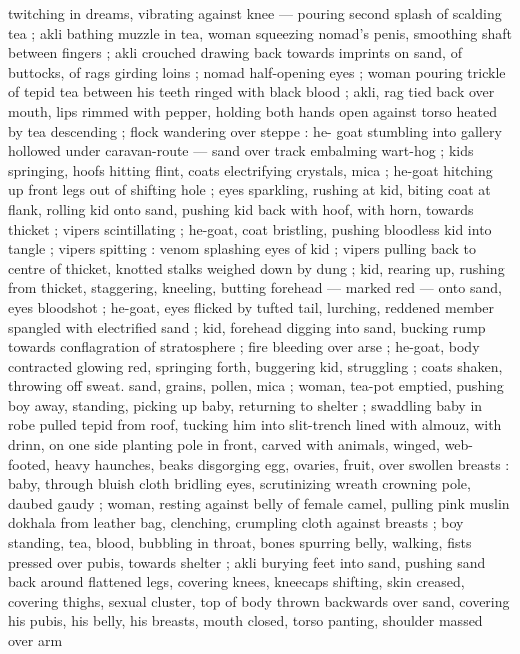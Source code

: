 twitching in dreams, vibrating against knee --- pouring second splash 
of scalding tea ; akli bathing muzzle in tea, woman squeezing 
nomad's penis, smoothing shaft between fingers ; akli crouched 
drawing back towards imprints on sand, of buttocks, of rags girding 
loins ; nomad half-opening eyes ; woman pouring trickle of tepid tea 
between his teeth ringed with black blood ; akli, rag tied back over 
mouth, lips rimmed with pepper, holding both hands open against 
torso heated by tea descending ; flock wandering over steppe : he- 
goat stumbling into gallery hollowed under caravan-route --- sand 
over track embalming wart-hog ; kids springing, hoofs hitting flint, 
coats electrifying crystals, mica ; he-goat hitching up front legs out 
of shifting hole ; eyes sparkling, rushing at kid, biting coat at flank, 
rolling kid onto sand, pushing kid back with hoof, with horn, towards 
thicket ; vipers scintillating ; he-goat, coat bristling, pushing 
bloodless kid into tangle ; vipers spitting : venom splashing eyes of 
kid ; vipers pulling back to centre of thicket, knotted stalks weighed 
down by dung ; kid, rearing up, rushing from thicket, staggering, 
kneeling, butting forehead --- marked red --- onto sand, eyes 
bloodshot ; he-goat, eyes flicked by tufted tail, lurching, reddened 
member spangled with electrified sand ; kid, forehead digging into 
sand, bucking rump towards conflagration of stratosphere ; fire 
bleeding over arse ; he-goat, body contracted glowing red, springing 
forth, buggering kid, struggling ; coats shaken, throwing off sweat. 
sand, grains, pollen, mica ; woman, tea-pot emptied, pushing boy 
away, standing, picking up baby, returning to shelter ; swaddling 
baby in robe pulled tepid from roof, tucking him into slit-trench lined 
with almouz, with drinn, on one side planting pole in front, carved 
with animals, winged, web-footed, heavy haunches, beaks disgorging 
egg, ovaries, fruit, over swollen breasts : baby, through bluish cloth 
bridling eyes, scrutinizing wreath crowning pole, daubed gaudy ; 
woman, resting against belly of female camel, pulling pink muslin 
dokhala from leather bag, clenching, crumpling cloth against breasts 
; boy standing, tea, blood, bubbling in throat, bones spurring belly, 
walking, fists pressed over pubis, towards shelter ; akli burying feet 
into sand, pushing sand back around flattened legs, covering knees, 
kneecaps shifting, skin creased, covering thighs, sexual cluster, top 
of body thrown backwards over sand, covering his pubis, his belly, 
his breasts, mouth closed, torso panting, shoulder massed over arm 
